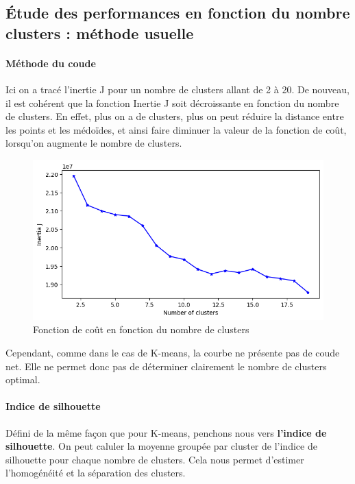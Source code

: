 \documentclass[french,a4paper,18pt]{article}
\begin{document}
\subsection{Étude des performances en fonction du nombre clusters : méthode usuelle}

\paragraph{Méthode du coude}

Ici on a tracé l'inertie J pour un nombre de clusters allant de 2 à 20. De nouveau, il est cohérent que la fonction Inertie J 
soit décroissante en fonction du nombre de clusters. En effet, plus on a de clusters, plus on peut réduire la distance 
entre les points et les médoïdes, et ainsi faire diminuer la valeur de la fonction de coût, lorsqu'on augmente le nombre de clusters. 

\begin{figure}[h!]
    \centering
    \includegraphics[scale=0.4]{images/mnist_kmedoids_inertia.png}
    \caption{Fonction de coût en fonction du nombre de clusters}\label{fig:mnist_kmedoids_cost}
\end{figure}

Cependant, comme dans le cas de K-means, la courbe ne présente pas de coude net.
Elle ne permet donc pas de déterminer clairement le nombre de clusters optimal.

\paragraph{Indice de silhouette}

Défini de la même façon que pour K-means, penchons nous vers \textbf{l'indice de silhouette}.
On peut caluler la moyenne groupée par cluster de l'indice de silhouette pour chaque nombre de clusters.
Cela nous permet d'estimer l'homogénéité et la séparation des clusters.
\end{document}
